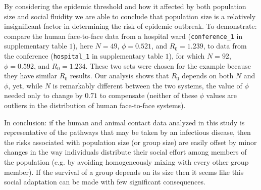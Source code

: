 \documentclass[10pt]{article}
\begin{document}
\begin{multicols}{2}
By considering the epidemic threshold and how it affected by both population size and social fluidity we are able to conclude that population size is a relatively insignificant factor in determining the risk of epidemic outbreak. To demonstrate: compare the human face-to-face data from a hospital ward (\verb|conference_1| in supplementary table $1$), here $N=49$, $\phi=0.521$, and $R_{0}=1.239$, to data from the conference (\verb|hospital_1| in supplementary table $1$), for which $N=92$, $\phi=0.592$, and $R_{0}=1.234$. These two sets were chosen for the example because they have similar $R_{0}$ results. Our analysis shows that $R_{0}$ depends on both $N$ and $\phi$, yet, while $N$ is remarkably different between the two systems, the value of $\phi$ needed only to change by $0.71$ to compensate (neither of these $\phi$ values are outliers in the distribution of human face-to-face systems). 

In conclusion: if the human and animal contact data analyzed in this study is representative of the pathways that may be taken by an infectious disease, then the risks associated with population size (or group size) are easily offset by minor changes in the way individuals distribute their social effort among members of the population (e.g. by avoiding homogeneously mixing with every other group member). If the survival of a group depends on its size then it seems like this social adaptation can be made with few significant consequences.

\end{multicols}
\small


\normalsize
\end{document}

